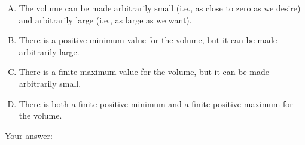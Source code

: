 \documentclass[10pt]{amsart}
\begin{document}
\begin{enumerate}
  \begin{enumerate}[(A)]
  \item The volume can be made arbitrarily small (i.e., as close to
    zero as we desire) and arbitrarily large (i.e., as large as we
    want).
  \item There is a positive minimum value for the volume, but it can
    be made arbitrarily large.
  \item There is a finite maximum value for the volume, but it can be
    made arbitrarily small.
  \item There is both a finite positive minimum and a finite positive
    maximum for the volume.
  \end{enumerate}

  \vspace{0.1in}
  Your answer: $\underline{\qquad\qquad\qquad\qquad\qquad\qquad\qquad}$
  \vspace{0.6in}

\end{enumerate}
\end{document}
